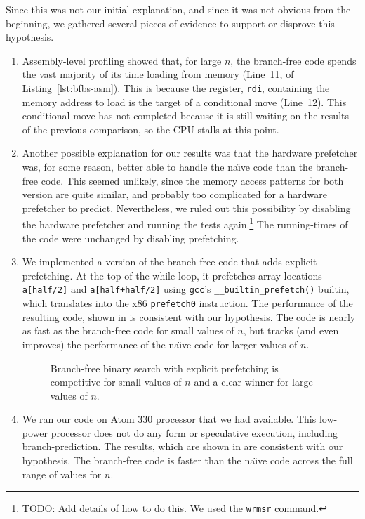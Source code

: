\documentclass{patmorin}
\newcommand{\lstref}[1]{Listing~\ref{lst:#1}}
\begin{document}
Since this was not our initial explanation, and since it was not obvious
from the beginning, we gathered several pieces of evidence to support
or disprove this hypothesis.

\begin{enumerate}
\item Assembly-level profiling showed that, for large $n$, the
  branch-free code spends the vast majority of its time loading from
  memory (Line~11, of \lstref{bfbs-asm}).  This is because the register,
  \texttt{rdi},  containing the memory address to load is the
  target of a conditional move (Line~12).  This conditional move has not
  completed because it is still waiting on the results of the previous
  comparison, so the CPU stalls at this point.

\item Another possible explanation for our results was that the hardware
   prefetcher was, for some reason, better able to handle the na\"{\i}ve
   code than the branch-free code.  This seemed unlikely, since the memory
   access patterns for both version are quite similar, and probably too
   complicated for a hardware prefetcher to predict. Nevertheless, we
   ruled out this possibility by disabling the hardware prefetcher and
   running the tests again.\footnote{TODO: Add details of how to do this.
   We used the \texttt{wrmsr} command.}  The running-times
   of the code were unchanged by disabling prefetching.

\item We implemented a version of the branch-free code that adds explicit
   prefetching. At the top of the while loop, it
   prefetches array locations \texttt{a[half/2]}
   and \texttt{a[half+half/2]} using \texttt{gcc}'s
   \texttt{__builtin_prefetch()} builtin, which translates into
   the x86 \texttt{prefetch0} instruction.  The performance of
   the resulting code, shown in  is consistent with our
   hypothesis.  The code is nearly as fast as the branch-free code for
   small values of $n$, but tracks (and even improves) the performance
   of the na\"{\i}ve code for larger values of $n$.

\begin{figure}
   \caption{Branch-free binary search with explicit prefetching is competitive
    for small values of $n$ and a clear winner for large values of $n$.}
\end{figure}

\item We ran our code on Atom 330 processor that we had available.  This
   low-power processor does not do any form or speculative
   execution, including branch-prediction.  The results, which are
   shown in  are consistent with our hypothesis.
   The branch-free code is faster than the na\"{\i}ve code across the full
   range of values for $n$. 
\end{enumerate}
\end{document}
